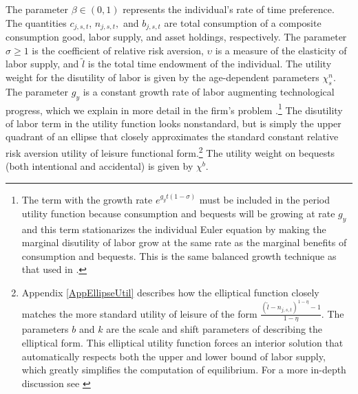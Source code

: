 \noindent\noindent The parameter $\beta\in(0,1)$ represents the individual's rate of time preference.  The quantities $c_{j,s,t}$, $n_{j,s,t},$ and $b_{j,s,t}$ are total consumption of a composite consumption good, labor supply, and asset holdings, respectively.  The parameter $\sigma \geq 1$ is the coefficient of relative risk aversion, $\upsilon$ is a measure of the elasticity of labor supply, and $\tilde{l}$ is the total time endowment of the individual.  The utility weight for the disutility of labor is given by the age-dependent parameters $\chi^{n}_{s}$.  The parameter $g_y$ is a constant growth rate of labor augmenting technological progress, which we explain in more detail in the firm's problem .\footnote{The term with the growth rate $e^{g_y t(1-\sigma)}$ must be included in the period utility function because consumption and bequests will be growing at rate $g_y$ and this term stationarizes the individual Euler equation by making the marginal disutility of labor grow at the same rate as the marginal benefits of consumption and bequests.  This is the same balanced growth technique as that used in \citet{MertensRavn:2011}.}  The disutility of labor term in the utility function looks nonstandard, but is simply the upper quadrant of an ellipse that closely approximates the standard constant relative risk aversion utility of leisure functional form.\footnote{Appendix \ref{AppEllipseUtil} describes how the elliptical function closely matches the more standard utility of leisure of the form $\frac{(\tilde{l}-n_{j,s,t})^{1-\eta} - 1}{1-\eta}$. The parameters $b$ and $k$ are the scale and shift parameters of describing the elliptical form.  This elliptical utility function forces an interior solution that automatically respects both the upper and lower bound of labor supply, which greatly simplifies the computation of equilibrium.  For a more in-depth discussion see \citet{EvanPhillips:2015}} The utility weight on bequests (both intentional and accidental) is given by $\chi^{b}$.

